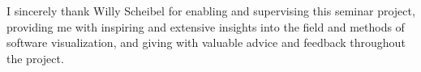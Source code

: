 \begin{acks}
	I sincerely thank Willy Scheibel for enabling and supervising this seminar project, providing me with inspiring and extensive insights into the field and methods of software visualization, and giving with valuable advice and feedback throughout the project.
\end{acks}
